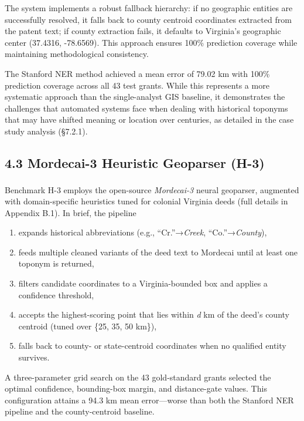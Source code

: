 \documentclass[
  10pt,
  twocolumn]{article}
\providecommand{\tightlist}{%
  \setlength{\itemsep}{0pt}\setlength{\parskip}{0pt}}
\begin{document}
The system implements a robust fallback hierarchy: if no geographic
entities are successfully resolved, it falls back to county centroid
coordinates extracted from the patent text; if county extraction fails,
it defaults to Virginia's geographic center (37.4316, -78.6569). This
approach ensures 100\% prediction coverage while maintaining
methodological consistency.

The Stanford NER method achieved a mean error of 79.02 km with 100\%
prediction coverage across all 43 test grants. While this represents a
more systematic approach than the single-analyst GIS baseline, it
demonstrates the challenges that automated systems face when dealing
with historical toponyms that may have shifted meaning or location over
centuries, as detailed in the case study analysis (§7.2.1).

\subsection{4.3 Mordecai-3 Heuristic Geoparser
(H-3)}\label{mordecai-3-heuristic-geoparser-h-3}

Benchmark H-3 employs the open-source \emph{Mordecai-3} neural
geoparser\textsuperscript{},
augmented with domain-specific heuristics tuned for colonial Virginia
deeds (full details in Appendix B.1). In brief, the pipeline

\begin{enumerate}
\def\labelenumi{\arabic{enumi}.}
\tightlist
\item
  expands historical abbreviations (e.g., ``Cr.''→\emph{Creek},
  ``Co.''→\emph{County}),
\item
  feeds multiple cleaned variants of the deed text to Mordecai until at
  least one toponym is returned,
\item
  filters candidate coordinates to a Virginia-bounded box and applies a
  confidence threshold,
\item
  accepts the highest-scoring point that lies within \emph{d} km of the
  deed's county centroid (tuned over \{25, 35, 50 km\}),
\item
  falls back to county- or state-centroid coordinates when no qualified
  entity survives.
\end{enumerate}

A three-parameter grid search on the 43 gold-standard grants selected
the optimal confidence, bounding-box margin, and distance-gate values.
This configuration attains a 94.3 km mean error---worse than both the
Stanford NER pipeline and the county-centroid baseline.
\end{document}
